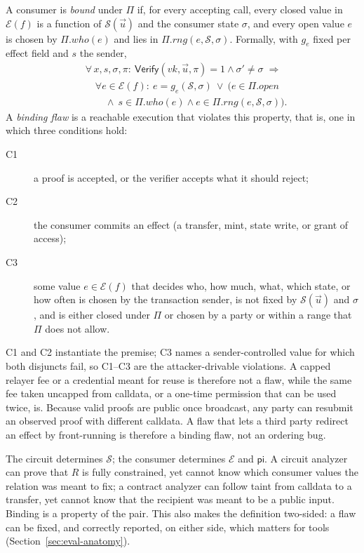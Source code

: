 A consumer is \emph{bound} under $\Pi$ if, for every accepting call, every
closed value in $\mathcal{E}(f)$ is a function of $\mathcal{S}(\vec{u})$ and
the consumer state $\sigma$, and every open value $e$ is chosen by
$\Pi.\mathit{who}(e)$ and lies in $\Pi.\mathit{rng}(e,\mathcal{S},\sigma)$.
Formally, with $g_e$ fixed per effect field and $s$ the sender,
\[
\begin{aligned}
&\forall\, x,s,\sigma,\pi:\ \mathsf{Verify}(\mathit{vk},\vec{u},\pi)=1
\land \sigma'\neq\sigma \;\Rightarrow\\
&\quad \forall e\in\mathcal{E}(f):\ e = g_e(\mathcal{S},\sigma)\ \lor\ \bigl(e\in\Pi.\mathit{open}\\
&\qquad \land\ s\in\Pi.\mathit{who}(e) \land e\in\Pi.\mathit{rng}(e,\mathcal{S},\sigma)\bigr).
\end{aligned}
\]
A \emph{binding flaw} is a reachable execution that violates this property,
that is, one in which three conditions hold:
\begin{description}
\item[C1] a proof is accepted, or the verifier accepts what it should reject;
\item[C2] the consumer commits an effect (a transfer, mint, state write, or
grant of access);
\item[C3] some value $e \in \mathcal{E}(f)$ that decides who, how much, what,
which state, or how often is chosen by the transaction sender, is not fixed
by $\mathcal{S}(\vec{u})$ and $\sigma$, and is either closed under $\Pi$ or
chosen by a party or within a range that $\Pi$ does not allow.
\end{description}
C1 and C2 instantiate the premise; C3 names a sender-controlled value for
which both disjuncts fail, so C1--C3 are the attacker-drivable violations. A
capped relayer fee or a credential meant for reuse is therefore not a flaw,
while the same fee taken uncapped from calldata, or a one-time permission that
can be used twice, is. Because valid proofs are public once broadcast, any
party can resubmit an observed proof with different calldata. A flaw that
lets a third party redirect an effect by front-running is therefore a binding
flaw, not an ordering bug.

The circuit determines $\mathcal{S}$; the consumer determines $\mathcal{E}$
and $\mathsf{pi}$. A circuit analyzer can prove that $R$ is fully
constrained, yet cannot know which consumer values the relation was meant to
fix; a contract analyzer can follow taint from calldata to a transfer, yet
cannot know that the recipient was meant to be a public input. Binding is a
property of the pair. This also makes the definition two-sided: a flaw can be
fixed, and correctly reported, on either side, which matters for tools
(Section~\ref{sec:eval-anatomy}).

